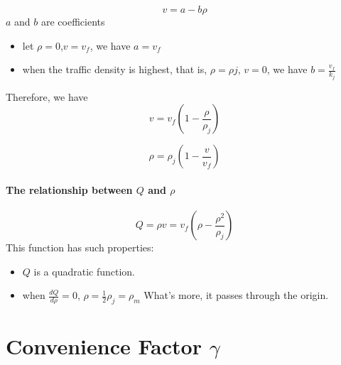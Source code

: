 \begin{equation}
v = a - b\rho
\end{equation}
$a$ and $b$ are coefficients

\begin{itemize}
\item let $\rho = 0$,$v = v_f$,
we have $a = v_f$
\\
\item when the traffic density is highest, that is,
$\rho = \rho j$, $v = 0$,
we have $b = \frac{v_f}{k_j}$
\end{itemize}

Therefore, we have 
\begin{equation}
v = v_f(1 - \frac{\rho}{\rho_j})
\end{equation}

\begin{equation}
\rho = \rho_j(1 - \frac{v}{v_f})
\end {equation}

\paragraph{The relationship between $Q$ and $\rho$ }
\begin{equation}
Q = \rho v = v_f(\rho - \frac{\rho^2}{\rho_j})
\end{equation}
This function has such properties:

\begin{itemize}
\item $Q$ is a quadratic function. 
\item when $\frac{dQ}{d \rho} = 0$, 
$\rho = \frac{1}{2}\rho_j = \rho_m $
What's more, it passes through the origin.
\end{itemize}




\section{Convenience Factor $ \gamma $}
\label{sec: Convenience Factor}

